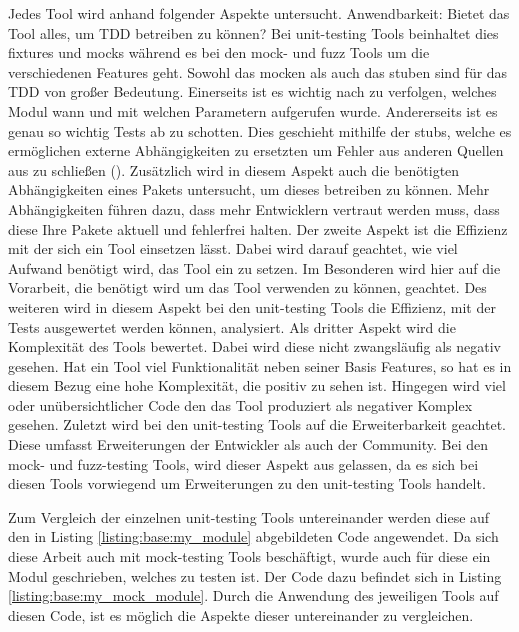 Jedes Tool wird anhand folgender Aspekte untersucht. Anwendbarkeit: Bietet das
Tool alles, um TDD betreiben zu können? Bei unit-testing Tools beinhaltet dies
\Glspl{fixture} und \Glspl{mock} während es bei den \gls{mock}- und \gls{fuzz} 
Tools um die verschiedenen Features geht. Sowohl das \Gls{mock}en als auch das
\Gls{stub}en sind für das TDD von großer Bedeutung. Einerseits ist es wichtig
nach zu verfolgen, welches Modul wann und mit welchen Parametern aufgerufen
wurde. Andererseits ist es genau so wichtig Tests ab zu schotten. Dies
geschieht mithilfe der \Glspl{stub}, welche es ermöglichen externe
Abhängigkeiten zu ersetzten um Fehler aus anderen Quellen aus zu schließen 
(\cite{percival:tdd:python}).
Zusätzlich wird in diesem Aspekt auch die benötigten Abhängigkeiten eines
Pakets untersucht, um dieses betreiben zu können. Mehr
Abhängigkeiten führen dazu, dass mehr Entwicklern vertraut werden muss, dass
diese Ihre Pakete aktuell und fehlerfrei halten.
Der zweite Aspekt ist die Effizienz mit der sich ein Tool einsetzen lässt. Dabei
wird darauf geachtet, wie viel Aufwand benötigt wird, das Tool ein zu setzen. Im
Besonderen wird hier auf die Vorarbeit, die benötigt wird um das Tool verwenden
zu können, geachtet. Des weiteren wird in diesem Aspekt bei den unit-testing
Tools die Effizienz, mit der Tests ausgewertet werden können, analysiert.
Als dritter Aspekt wird die Komplexität des Tools bewertet. Dabei wird diese
nicht zwangsläufig als negativ gesehen. Hat ein Tool viel
Funktionalität neben seiner Basis Features, so hat es in diesem Bezug eine hohe
Komplexität, die positiv zu sehen ist. Hingegen wird viel oder
unübersichtlicher Code den das Tool produziert als negativer Komplex gesehen.
Zuletzt wird bei den unit-testing Tools auf die Erweiterbarkeit geachtet. Diese
umfasst Erweiterungen der Entwickler als auch der Community. Bei den mock- und
fuzz-testing Tools, wird dieser Aspekt aus gelassen, da es sich bei diesen Tools
vorwiegend um Erweiterungen zu den unit-testing Tools handelt.
\newline

Zum Vergleich der einzelnen unit-testing Tools untereinander werden diese auf
den in Listing \ref{listing:base:my_module} abgebildeten Code angewendet. Da
sich diese Arbeit auch mit \gls{mock}-testing Tools beschäftigt, wurde auch für
diese ein Modul geschrieben, welches zu testen ist.
Der Code dazu befindet sich in Listing \ref{listing:base:my_mock_module}. Durch
die Anwendung des jeweiligen Tools auf diesen Code, ist es möglich die Aspekte
dieser untereinander zu vergleichen.

